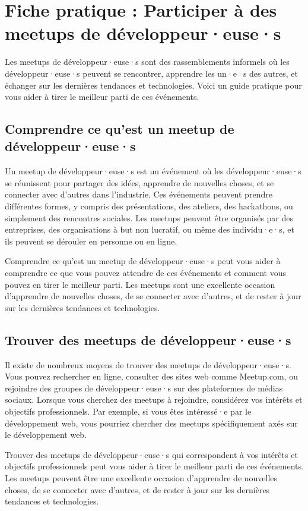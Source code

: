 \chapter{Fiche pratique : Participer à des meetups de développeur·euse·s}

Les meetups de développeur·euse·s sont des rassemblements informels où les développeur·euse·s peuvent se rencontrer, apprendre les un·e·s des autres, et échanger sur les dernières tendances et technologies. Voici un guide pratique pour vous aider à tirer le meilleur parti de ces événements.

\section{Comprendre ce qu'est un meetup de développeur·euse·s}

Un meetup de développeur·euse·s est un événement où les développeur·euse·s se réunissent pour partager des idées, apprendre de nouvelles choses, et se connecter avec d'autres dans l'industrie. Ces événements peuvent prendre différentes formes, y compris des présentations, des ateliers, des hackathons, ou simplement des rencontres sociales. Les meetups peuvent être organisés par des entreprises, des organisations à but non lucratif, ou même des individu·e·s, et ils peuvent se dérouler en personne ou en ligne.

Comprendre ce qu'est un meetup de développeur·euse·s peut vous aider à comprendre ce que vous pouvez attendre de ces événements et comment vous pouvez en tirer le meilleur parti. Les meetups sont une excellente occasion d'apprendre de nouvelles choses, de se connecter avec d'autres, et de rester à jour sur les dernières tendances et technologies.

\section{Trouver des meetups de développeur·euse·s}

Il existe de nombreux moyens de trouver des meetups de développeur·euse·s. Vous pouvez rechercher en ligne, consulter des sites web comme Meetup.com, ou rejoindre des groupes de développeur·euse·s sur des plateformes de médias sociaux. Lorsque vous cherchez des meetups à rejoindre, considérez vos intérêts et objectifs professionnels. Par exemple, si vous êtes intéressé·e par le développement web, vous pourriez chercher des meetups spécifiquement axés sur le développement web.

Trouver des meetups de développeur·euse·s qui correspondent à vos intérêts et objectifs professionnels peut vous aider à tirer le meilleur parti de ces événements. Les meetups peuvent être une excellente occasion d'apprendre de nouvelles choses, de se connecter avec d'autres, et de rester à jour sur les dernières tendances et technologies.

